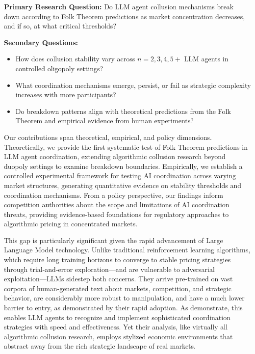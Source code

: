 \textbf{Primary Research Question:} Do LLM agent collusion mechanisms break down according to Folk Theorem predictions as market concentration decreases, and if so, at what critical thresholds?

\textbf{Secondary Questions:}
\begin{itemize}
    \item How does collusion stability vary across $n = 2, 3, 4, 5+$ LLM agents in controlled oligopoly settings?
    \item What coordination mechanisms emerge, persist, or fail as strategic complexity increases with more participants?
    \item Do breakdown patterns align with theoretical predictions from the Folk Theorem and empirical evidence from human experiments?
\end{itemize}

Our contributions span theoretical, empirical, and policy dimensions. Theoretically, we provide the first systematic test of Folk Theorem predictions in LLM agent coordination, extending algorithmic collusion research beyond duopoly settings to examine breakdown boundaries. Empirically, we establish a controlled experimental framework for testing AI coordination across varying market structures, generating quantitative evidence on stability thresholds and coordination mechanisms. From a policy perspective, our findings inform competition authorities about the scope and limitations of AI coordination threats, providing evidence-based foundations for regulatory approaches to algorithmic pricing in concentrated markets.

This gap is particularly significant given the rapid advancement of Large Language Model technology. Unlike traditional reinforcement learning algorithms, which require long training horizons to converge to stable pricing strategies through trial-and-error exploration—and are vulnerable to adversarial exploitation—LLMs sidestep both concerns. They arrive pre-trained on vast corpora of human-generated text about markets, competition, and strategic behavior, are considerably more robust to manipulation, and have a much lower barrier to entry, as demonstrated by their rapid adoption. As \textcite{fish_algorithmic_2025} demonstrate, this enables LLM agents to recognize and implement sophisticated coordination strategies with speed and effectiveness. Yet their analysis, like virtually all algorithmic collusion research, employs stylized economic environments that abstract away from the rich strategic landscape of real markets.

